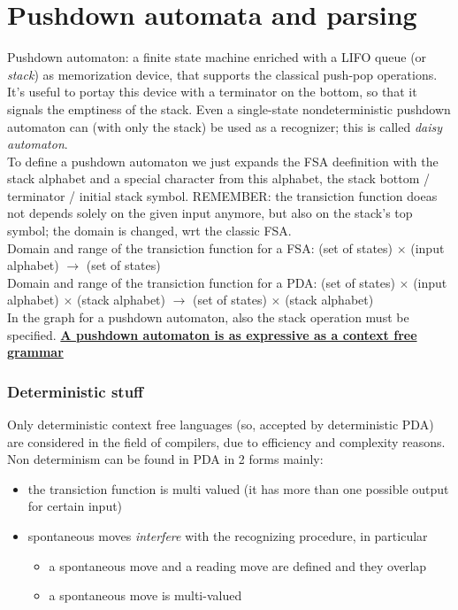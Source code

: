 \documentclass[10pt,a4paper]{article}
\begin{document}
	\part{Pushdown automata and parsing}
		Pushdown automaton: a finite state machine enriched with a LIFO queue (or \emph{stack}) as memorization device, that supports the classical push-pop operations. It's useful to portay this device with a terminator on the bottom, so that it signals the emptiness of the stack. Even a single-state nondeterministic pushdown automaton can (with only the stack) be used as a recognizer; this is called \emph{daisy automaton}.\\
		To define a pushdown automaton we just expands the FSA deefinition with the stack alphabet and a special character from this alphabet, the stack bottom / terminator / initial stack symbol. REMEMBER: the transiction function doeas not depends solely on the given input anymore, but also on the stack's top symbol; the domain is changed, wrt the classic FSA.\\
		Domain and range of the transiction function for a FSA: (set of states) $\times$ (input alphabet) $\rightarrow$ (set of states)\\
		Domain and range of the transiction function for a PDA: (set of states) $\times$ (input alphabet) $\times$ (stack alphabet) $\rightarrow$ (set of states) $\times$ (stack alphabet)\\
		In the graph for a pushdown automaton, also the stack operation must be specified.
		\textbf{\underline{A pushdown automaton is as expressive as a context free grammar}}
		
		\section{Deterministic stuff}
			Only deterministic context free languages (so, accepted by deterministic PDA) are considered in the field of compilers, due to efficiency and complexity reasons.\\
			Non determinism can be found in PDA in 2 forms mainly:
			\begin{itemize}
				\item the transiction function is multi valued (it has more than one possible output for certain input)
				\item spontaneous moves \emph{interfere} with the recognizing procedure, in particular
					\begin{itemize}
						\item a spontaneous move and a reading move are defined and they overlap
						\item a spontaneous move is multi-valued
					\end{itemize}
			\end{itemize}
			
\end{document}
